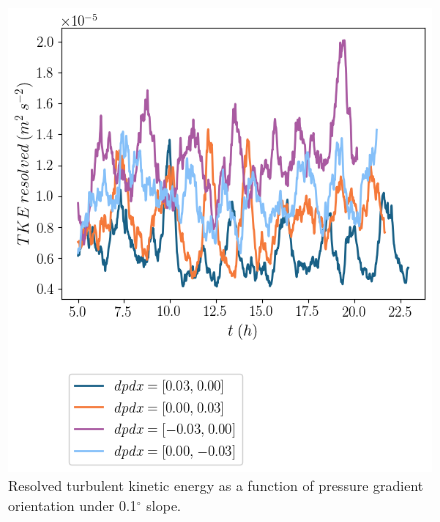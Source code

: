 \begin{figure}
    \centering
    \includegraphics{Figures/e_res_cmp_dpdy_dpdx_t.png}
    \caption{Resolved turbulent kinetic energy as a function of pressure gradient orientation under 0.1$^{\circ}$ slope.}
    \label{fig:e_orientation}
\end{figure}

